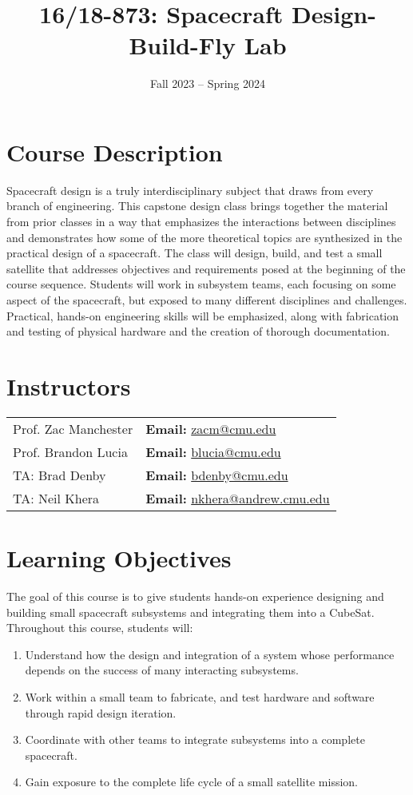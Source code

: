\documentclass[11pt,letterpaper]{article}
\title{16/18-873: Spacecraft Design-Build-Fly Lab}
\author{Fall 2023 -- Spring 2024}
\date{}
\begin{document}
\maketitle

\section*{Course Description}

Spacecraft design is a truly interdisciplinary subject that draws from every branch of engineering. This capstone design class brings together the material from prior classes in a way that emphasizes the interactions between disciplines and demonstrates how some of the more theoretical topics are synthesized in the practical design of a spacecraft. The class will design, build, and test a small satellite that addresses objectives and requirements posed at the beginning of the course sequence. Students will work in subsystem teams, each focusing on some aspect of the spacecraft, but exposed to many different disciplines and challenges. Practical, hands-on engineering skills will be emphasized, along with fabrication and testing of physical hardware and the creation of thorough documentation.

\section*{Instructors}

\begin{center}
\begin{tabular}{l l}
	Prof. Zac Manchester & \textbf{Email:} \href{mailto:zacm@cmu.edu}{zacm@cmu.edu} \\
	Prof. Brandon Lucia & \textbf{Email:} \href{mailto:blucia@cmu.edu}{blucia@cmu.edu}
	\\
	TA: Brad Denby & \textbf{Email:} \href{mailto:bdenby@cmu.edu}{bdenby@cmu.edu}
	\\
	TA: Neil Khera & \textbf{Email:} \href{nkhera@andrew.cmu.edu}{nkhera@andrew.cmu.edu}
\end{tabular}
\end{center}

\section*{Learning Objectives}

The goal of this course is to give students hands-on experience designing and building small spacecraft subsystems and integrating them into a CubeSat. Throughout this course, students will:
\begin{enumerate}
	\item Understand how the design and integration of a system whose performance depends on the success of many interacting subsystems.
	\item Work within a small team to fabricate, and test hardware and software through rapid design iteration.
	\item Coordinate with other teams to integrate subsystems into a complete spacecraft.
	\item Gain exposure to the complete life cycle of a small satellite mission.
\end{enumerate}
\end{document}
